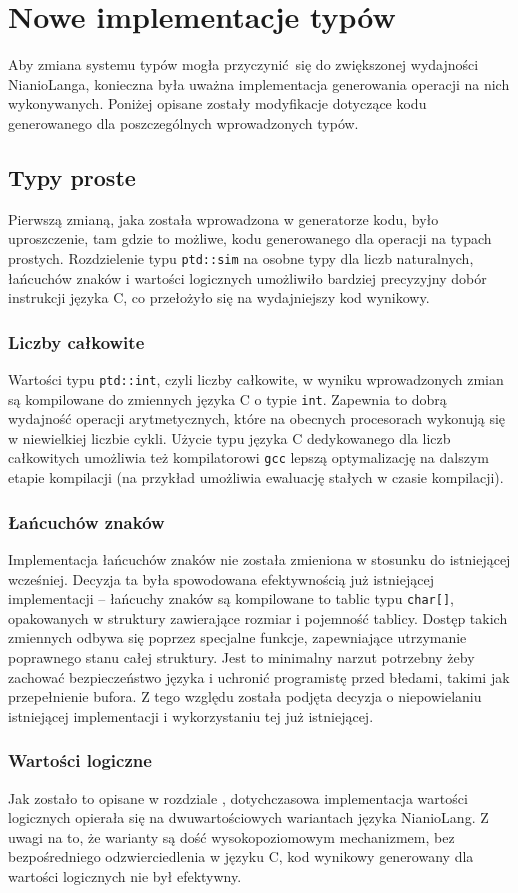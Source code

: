 \documentclass[licencjacka]{pracamgr}
\begin{document}
\chapter{Nowe implementacje typów}
Aby zmiana systemu typów mogła przyczynić się do zwiększonej wydajności NianioLanga, konieczna była uważna
implementacja generowania operacji na nich wykonywanych.
Poniżej opisane zostały modyfikacje dotyczące kodu generowanego dla poszczególnych wprowadzonych typów.
\section{Typy proste}
Pierwszą zmianą, jaka została wprowadzona w generatorze kodu, było uproszczenie,
tam gdzie to możliwe, kodu generowanego dla operacji na typach prostych.
Rozdzielenie typu \texttt{ptd::sim} na osobne typy dla liczb naturalnych,
łańcuchów znaków i wartości logicznych umożliwiło bardziej precyzyjny dobór instrukcji języka C,
co przełożyło się na wydajniejszy kod wynikowy.

\subsection{Liczby całkowite}
Wartości typu \texttt{ptd::int}, czyli liczby całkowite, w wyniku wprowadzonych zmian są kompilowane
do zmiennych języka C o typie \texttt{int}. Zapewnia to dobrą wydajność operacji arytmetycznych,
które na obecnych procesorach wykonują się w niewielkiej liczbie cykli. Użycie typu języka C
dedykowanego dla liczb całkowitych umożliwia też kompilatorowi \texttt{gcc} lepszą optymalizację
na dalszym etapie kompilacji (na przykład umożliwia ewaluację stałych w czasie kompilacji).
\subsection{Łańcuchów znaków}
Implementacja łańcuchów znaków nie została zmieniona w stosunku do istniejącej wcześniej.
Decyzja ta była spowodowana efektywnością już istniejącej implementacji -- łańcuchy znaków
są kompilowane to tablic typu \texttt{char[]}, opakowanych w struktury zawierające
rozmiar i pojemność tablicy. Dostęp takich zmiennych odbywa się poprzez specjalne funkcje,
zapewniające utrzymanie poprawnego stanu całej struktury. Jest to minimalny narzut potrzebny żeby
zachować bezpieczeństwo języka i uchronić programistę przed błedami, takimi jak przepełnienie bufora.
Z tego względu została podjęta decyzja o niepowielaniu istniejącej implementacji i wykorzystaniu
tej już istniejącej.
\subsection{Wartości logiczne}
Jak zostało to opisane w rozdziale \textit{}, dotychczasowa implementacja
wartości logicznych opierała się na dwuwartościowych wariantach
języka NianioLang. Z uwagi na to, że warianty są dość wysokopoziomowym mechanizmem, bez
bezpośredniego odzwierciedlenia w języku C, kod wynikowy generowany dla wartości logicznych nie był
efektywny.
\end{document}
